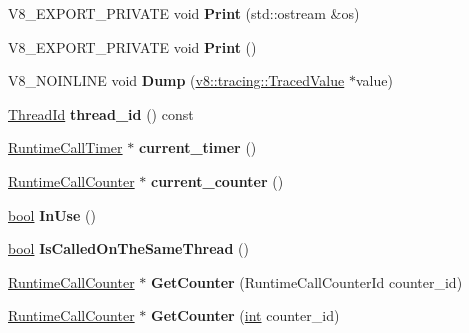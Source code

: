 \begin{DoxyCompactItemize}
V8\+\_\+\+E\+X\+P\+O\+R\+T\+\_\+\+P\+R\+I\+V\+A\+TE void {\bfseries Print} (std\+::ostream \&os)
\item 
\mbox{\label{classv8_1_1internal_1_1RuntimeCallStats_ac5790dddc152f0d2156418571b26bac2}} 
V8\+\_\+\+E\+X\+P\+O\+R\+T\+\_\+\+P\+R\+I\+V\+A\+TE void {\bfseries Print} ()
\item 
\mbox{\label{classv8_1_1internal_1_1RuntimeCallStats_a13295a5bf3d58ab08933503ba79acde3}} 
V8\+\_\+\+N\+O\+I\+N\+L\+I\+NE void {\bfseries Dump} (\mbox{\hyperlink{classv8_1_1tracing_1_1TracedValue}{v8\+::tracing\+::\+Traced\+Value}} $\ast$value)
\item 
\mbox{\label{classv8_1_1internal_1_1RuntimeCallStats_ab502013067a11dc90c34bd86fd32b212}} 
\mbox{\hyperlink{classv8_1_1internal_1_1ThreadId}{Thread\+Id}} {\bfseries thread\+\_\+id} () const
\item 
\mbox{\label{classv8_1_1internal_1_1RuntimeCallStats_a9c1851ba664ce8878d40c2777d9bcc1b}} 
\mbox{\hyperlink{classv8_1_1internal_1_1RuntimeCallTimer}{Runtime\+Call\+Timer}} $\ast$ {\bfseries current\+\_\+timer} ()
\item 
\mbox{\label{classv8_1_1internal_1_1RuntimeCallStats_a0999af0eb02347f403d4e150ba6b021c}} 
\mbox{\hyperlink{classv8_1_1internal_1_1RuntimeCallCounter}{Runtime\+Call\+Counter}} $\ast$ {\bfseries current\+\_\+counter} ()
\item 
\mbox{\label{classv8_1_1internal_1_1RuntimeCallStats_a4d1df8cba3e9c99393ce2e0be9b41ebd}} 
\mbox{\hyperlink{classbool}{bool}} {\bfseries In\+Use} ()
\item 
\mbox{\label{classv8_1_1internal_1_1RuntimeCallStats_af2bf859b649a6d4f74e68c33b6db6e54}} 
\mbox{\hyperlink{classbool}{bool}} {\bfseries Is\+Called\+On\+The\+Same\+Thread} ()
\item 
\mbox{\label{classv8_1_1internal_1_1RuntimeCallStats_a9a10c6ff3c212cb236408b8f0c9aedb0}} 
\mbox{\hyperlink{classv8_1_1internal_1_1RuntimeCallCounter}{Runtime\+Call\+Counter}} $\ast$ {\bfseries Get\+Counter} (Runtime\+Call\+Counter\+Id counter\+\_\+id)
\item 
\mbox{\label{classv8_1_1internal_1_1RuntimeCallStats_af44c4998a36b0abd150bd9249529c61e}} 
\mbox{\hyperlink{classv8_1_1internal_1_1RuntimeCallCounter}{Runtime\+Call\+Counter}} $\ast$ {\bfseries Get\+Counter} (\mbox{\hyperlink{classint}{int}} counter\+\_\+id)
\end{DoxyCompactItemize}
